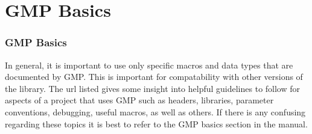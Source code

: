 
\section{GMP Basics}

\begin{frame}
\frametitle{GMP Basics}
In general, it is important to use only specific macros and data types that are documented by GMP. This is important for
compatability with other versions of the library. The url listed gives some insight into helpful guidelines to follow
for aspects of a project that uses GMP such as headers, libraries, parameter conventions, debugging, useful macros, as well as others.
If there is any confusing regarding these topics it is best to refer to the GMP basics section in the manual.
\end{frame}
